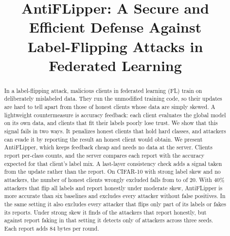 \documentclass[conference]{IEEEtran}
\begin{document}
\title{\fontsize{21}{25}\selectfont AntiFLipper: A Secure and Efficient Defense Against\\ Label-Flipping Attacks in Federated Learning}

\author{
}

\maketitle

\begin{abstract}
In a label-flipping attack, malicious clients in federated learning (FL) train on deliberately mislabeled data. They run the unmodified training code, so their updates are hard to tell apart from those of honest clients whose data are simply skewed. A lightweight countermeasure is accuracy feedback: each client evaluates the global model on its own data, and clients that fit their labels poorly lose trust. We show that this signal fails in two ways. It penalizes honest clients that hold hard classes, and attackers can evade it by reporting the result an honest client would obtain. We present AntiFLipper, which keeps feedback cheap and needs no data at the server. Clients report per-class counts, and the server compares each report with the accuracy expected for that client's label mix. A last-layer consistency check adds a signal taken from the update rather than the report. On CIFAR-10 with strong label skew and no attackers, the number of honest clients wrongly excluded falls from \cleanHonRaw{} to \cleanHon{} of 20. With 40\% attackers that flip all labels and report honestly under moderate skew, AntiFLipper is more accurate than six baselines and excludes every attacker without false positives. In the same setting it also excludes every attacker that flips only part of its labels or fakes its reports. Under strong skew it finds \skewRecall{} of the attackers that report honestly, but against report faking in that setting it detects only \fsFound{} of \fsTotal{} attackers across three seeds. Each report adds 84 bytes per round.
\end{abstract}
\end{document}

